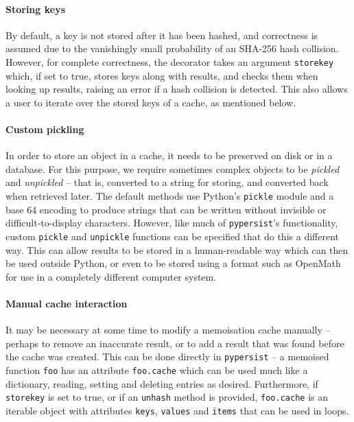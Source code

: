 \documentclass{deliverablereport}
\newcommand{\pypersist}{\texttt{pypersist}}
\begin{document}
\paragraph{Storing keys}
By default, a key is not stored after it has been hashed, and correctness is
assumed due to the vanishingly small probability of an SHA-256 hash collision.
However, for complete correctness, the decorator takes an argument
\texttt{storekey} which, if set to true, stores keys along with results, and
checks them when looking up results, raising an error if a hash collision is
detected.  This also allows a user to iterate over the stored keys of a cache,
as mentioned below.

\paragraph{Custom pickling}
In order to store an object in a cache, it needs to be preserved on disk or in a
database.  For this purpose, we require sometimes complex objects to be
\textit{pickled} and \textit{unpickled} -- that is, converted to a string for
storing, and converted back when retrieved later.  The default methods use
Python's \texttt{pickle} module and a base 64 encoding to produce strings that
can be written without invisible or difficult-to-display characters.  However,
like much of \texttt{pypersist}'s functionality, custom \texttt{pickle} and
\texttt{unpickle} functions can be specified that do this a different way.  This
can allow results to be stored in a human-readable way which can then be used
outside Python, or even to be stored using a format such as OpenMath for use in
a completely different computer system.

\paragraph{Manual cache interaction}
It may be necessary at some time to modify a memoisation cache manually --
perhaps to remove an inaccurate result, or to add a result that was found before
the cache was created.  This can be done directly in \pypersist{} -- a memoised
function \texttt{foo} has an attribute \texttt{foo.cache} which can be used much
like a dictionary, reading, setting and deleting entries as desired.
Furthermore, if \texttt{storekey} is set to true, or if an \texttt{unhash}
method is provided, \texttt{foo.cache} is an iterable object with attributes
\texttt{keys}, \texttt{values} and \texttt{items} that can be used in loops.
\end{document}
